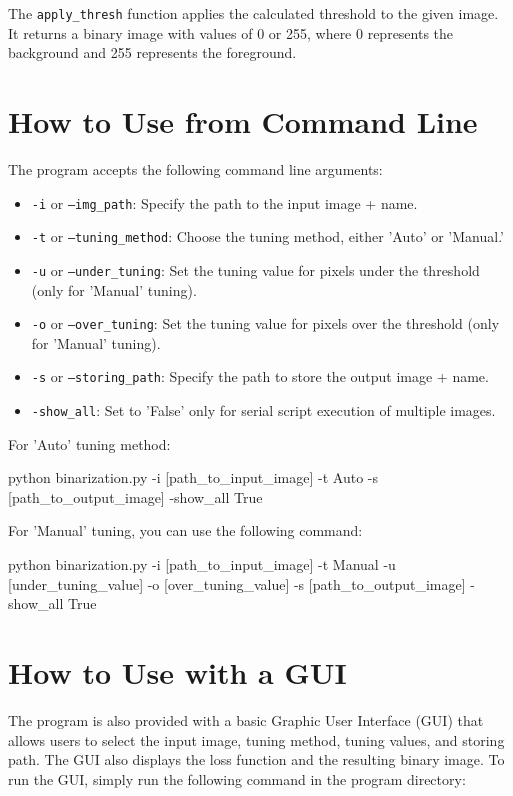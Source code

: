 \documentclass{article}
\begin{document}
The \texttt{apply\_thresh} function applies the calculated threshold to the given image. It returns a binary image with values of 0 or 255, where 0 represents the background and 255 represents the foreground.

\section{How to Use from Command Line}

The program accepts the following command line arguments:

\begin{itemize}
\item \texttt{-i} or \texttt{--img\_path}: Specify the path to the input image + name.
\item \texttt{-t} or \texttt{--tuning\_method}: Choose the tuning method, either 'Auto' or 'Manual.'
\item \texttt{-u} or \texttt{--under\_tuning}: Set the tuning value for pixels under the threshold (only for 'Manual' tuning).
\item \texttt{-o} or \texttt{--over\_tuning}: Set the tuning value for pixels over the threshold (only for 'Manual' tuning).
\item \texttt{-s} or \texttt{--storing\_path}: Specify the path to store the output image + name.
\item \texttt{-show\_all}: Set to 'False' only for serial script execution of multiple images.
\end{itemize}

\noindent
For 'Auto' tuning method:

\begin{bashscript}
python binarization.py -i [path_to_input_image] -t Auto -s [path_to_output_image] -show_all True
\end{bashscript}

\noindent
For 'Manual' tuning, you can use the following command:

\begin{bashscript}
python binarization.py -i [path_to_input_image] -t Manual -u [under_tuning_value] -o [over_tuning_value] -s [path_to_output_image] -show_all True
\end{bashscript}

\section{How to Use with a GUI}

The program is also provided with a basic Graphic User Interface (GUI) that allows users to select the input image, tuning method, tuning values, and storing path. The GUI also displays the loss function and the resulting binary image. To run the GUI, simply run the following command in the program directory:
\end{document}
